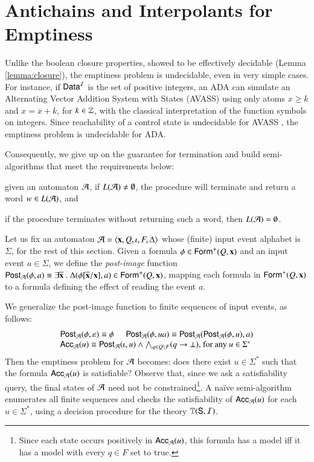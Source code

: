 \documentclass[10pt,conference,letterpaper,twocolumn]{IEEEtran}
\begin{document}
\section{Antichains and Interpolants for Emptiness}

Unlike the boolean closure properties, showed to be effectively
decidable (Lemma \ref{lemma:closure}), the emptiness problem is
undecidable, even in very simple cases. For instance, if $\mathsf{Data}^{\mathcal{I}}$ is
the set of positive integers, an ADA can simulate an Alternating
Vector Addition System with States (AVASS) using only atoms $x \geq k$
and $x = \overline{x} + k$, for $k \in {\bf \mathbb{Z}}$, with the classical
interpretation of the function symbols on integers. Since reachability
of a control state is undecidable for AVASS \cite{LINCOLN92}, the
emptiness problem is undecidable for ADA.

Consequently, we give up on the guarantee for termination and build
semi-algorithms that meet the requirements below: \begin{compactenum}[(i)]
\item given an automaton $\mathcal{A}$, if $L(\mathcal{A}) \neq\emptyset$, the procedure
  will terminate and return a word $w \in L(\mathcal{A})$, and
%
\item if the procedure terminates without returning such a word, then
  $L(\mathcal{A}) = \emptyset$.
\end{compactenum}

Let us fix an automaton $\mathcal{A} = \left\langle \mathbf x,Q,\iota,F,\Delta \right\rangle$ whose
(finite) input event alphabet is $\Sigma$, for the rest of this
section. Given a formula $\phi \in \mathsf{Form}^+(Q,\mathbf x)$ and an input
event $a \in \Sigma$, we define the \emph{post-image} function
$\mathsf{Post}_{\mathcal{A}}(\phi,a) \equiv \exists \overline{\mathbf x} ~.~
\Delta(\phi[\overline{\mathbf x}/\mathbf x], a) \in \mathsf{Form}^+(Q,\mathbf x)$,
mapping each formula in $\mathsf{Form}^+(Q,\mathbf x)$ to a formula defining the
effect of reading the event $a$.

We generalize the post-image function to finite sequences of input
events, as follows:
\[\begin{array}{l}
\mathsf{Post}_{\mathcal{A}}(\phi,\varepsilon) \equiv \phi \hspace*{5mm} \mathsf{Post}_{\mathcal{A}}(\phi,ua) \equiv \mathsf{Post}_{\mathcal{A}}(\mathsf{Post}_{\mathcal{A}}(\phi,u),a) \\
\mathsf{Acc}_{\mathcal{A}}(u) \equiv \mathsf{Post}_{\mathcal{A}}(\iota,u) \wedge \bigwedge_{q \in Q \setminus F} (q \rightarrow \bot)\text{, for any $u \in \Sigma^*$}
\end{array}\]
Then the emptiness problem for $\mathcal{A}$ becomes: does there exist $u \in
\Sigma^*$ such that the formula $\mathsf{Acc}_{\mathcal{A}}(u)$ is satisfiable?
Observe that, since we ask a satisfiability query, the final states of
$\mathcal{A}$ need not be constrained\footnote{ Since each state occurs
  positively in $\mathsf{Acc}_{\mathcal{A}}(u)$, this formula has a model iff it has
  a model with every $q \in F$ set to true.}. A na\"ive semi-algorithm
enumerates all finite sequences and checks the satisfiability of
$\mathsf{Acc}_{\mathcal{A}}(u)$ for each $u \in \Sigma^*$, using a decision procedure
for the theory $\mathbb{T}(\mathsf{S},\mathcal{I})$.
\end{document}
